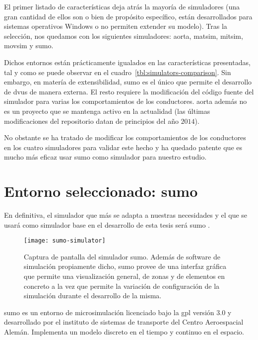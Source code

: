 El primer listado de características deja atrás la mayoría de simuladores (una gran cantidad de ellos son o bien de propósito específico, están desarrollados para sistemas operativos Windows o no permiten extender su modelo). Tras la selección, nos quedamos con los siguientes simuladores: \gls{aorta}, \gls{matsim}, \gls{mitsim}, \gls{movsim} y \gls{sumo}.

Dichos entornos están prácticamente igualados en las características presentadas, tal y como se puede observar en el cuadro~\ref{tbl:simulators-comparison}. Sin embargo, en matería de extensibilidad, \ac{sumo} es el único que permite el desarrollo de \acp{dvu} de manera externa. El resto requiere la modificación del código fuente del simulador para varias los comportamientos de los conductores. \ac{aorta} además no es un proyecto que se mantenga activo en la actualidad (las últimas modificaciones del repositorio datan de principios del año $2014$).

No obstante se ha tratado de modificar los comportamientos de los conductores en los cuatro simuladores para validar este hecho y ha quedado patente que es mucho más eficaz usar \gls{sumo} como simulador para nuestro estudio.

\section{Entorno seleccionado: \gls{sumo}}

En definitiva, el simulador que más se adapta a nuestras necesidades y el que se usará como simulador base en el desarrollo de esta tesis será \gls{sumo} \cite{krajzewicz2002sumo, behrisch2011sumo, krajzewicz2012recent}.

\begin{figure}[!b]
	\texttt{[image: sumo-simulator]}
	\caption[Captura de pantalla del simulador \gls{sumo}]{Captura de pantalla del simulador \gls{sumo}. Además de software de simulación propiamente dicho, \gls{sumo} provee de una interfaz gráfica que permite una visualización general, de zonas y de elementos en concreto a la vez que permite la variación de configuración de la simulación durante el desarrollo de la misma.}
	\label{fig:sumo-simulator}
\end{figure}

\gls{sumo} es un entorno de microsimulación licenciado bajo la \gls{gpl} versión $3.0$ y desarrollado por el instituto de sistemas de transporte del Centro Aeroespacial Alemán. Implementa un modelo discreto en el tiempo y continuo en el espacio.

